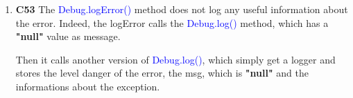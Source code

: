\begin{enumerate}
	\item \textbf{C53} The \textcolor{blue}{Debug.logError()} method does not log any useful information about the error.
		Indeed, the logError calls the \textcolor{blue}{Debug.log()} method, which has a \textbf{"null"} value as message.

		Then it calls another version of \textcolor{blue}{Debug.log()}, which simply get a logger and stores the level danger of the error, the msg, which is \textbf{"null"} and the informations about the exception.
\end{enumerate}
